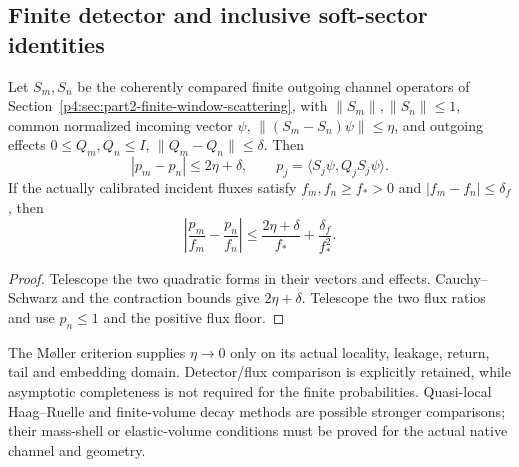\documentclass[12pt,a4paper]{article}
\begin{document}






\subsection{Finite detector and inclusive soft-sector identities}
\begin{proposition}
\label{p4:prop:v2210-lit-detector-stability}
Let $S_m,S_n$ be the coherently compared finite outgoing channel operators
of Section~\ref{p4:sec:part2-finite-window-scattering}, with
$\|S_m\|,\|S_n\|\le1$, common normalized incoming vector $\psi$,
$\|(S_m-S_n)\psi\|\le\eta$, and outgoing effects
$0\le Q_m,Q_n\le I$, $\|Q_m-Q_n\|\le\delta$. Then
\[
 |p_m-p_n|\le2\eta+\delta,\qquad
 p_j=\langle S_j\psi,Q_jS_j\psi\rangle.
\]
If the actually calibrated incident fluxes satisfy
$f_m,f_n\ge f_*>0$ and $|f_m-f_n|\le\delta_f$, then
\[
 \left|\frac{p_m}{f_m}-\frac{p_n}{f_n}\right|
 \le\frac{2\eta+\delta}{f_*}+\frac{\delta_f}{f_*^2}.
\]
\end{proposition}
\begin{proof}
Telescope the two quadratic forms in their vectors and effects. Cauchy--Schwarz
and the contraction bounds give $2\eta+\delta$. Telescope the two flux
ratios and use $p_n\le1$ and the positive flux floor.
\end{proof}
The M\o ller criterion supplies $\eta\to0$ only on its actual locality,
leakage, return, tail and embedding domain. Detector/flux comparison is
explicitly retained, while asymptotic completeness is not required for the
finite probabilities. Quasi-local Haag--Ruelle and finite-volume decay
methods \cite{LitQFTBachmannScattering2016,LitQFTLellouchLuscher2001}
are possible stronger comparisons; their mass-shell or elastic-volume
conditions must be proved for the actual native channel and geometry.
\end{document}
